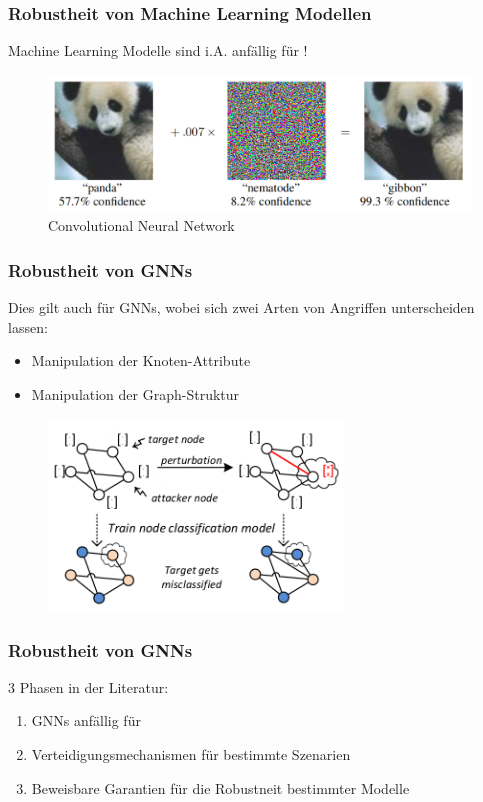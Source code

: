 \documentclass{beamer}
\begin{document}
\begin{frame}
  \frametitle{Robustheit von Machine Learning Modellen}

  Machine Learning Modelle sind i.A. anfällig für !

  \begin{figure}
    \centering
    \includegraphics[width=\textwidth]{img/adversarial.png}
    \caption*{Convolutional Neural Network \cite{}}
  \end{figure}
\end{frame}

\begin{frame}
  \frametitle{Robustheit von GNNs}
  Dies gilt auch für GNNs, wobei sich zwei Arten von Angriffen unterscheiden lassen:

  \begin{itemize}
    \item Manipulation der Knoten-Attribute
    \item Manipulation der Graph-Struktur
  \end{itemize}

  \begin{figure}
    \centering
    \includegraphics[width=0.7\textwidth]{img/adversarial_GNN.png}
    \caption*{ \cite{}}
  \end{figure}

\end{frame}

\begin{frame}
  \frametitle{Robustheit von GNNs}
  3 Phasen in der Literatur:
  \begin{enumerate}
    \item GNNs anfällig für 
    \item Verteidigungsmechanismen für bestimmte Szenarien
    \item Beweisbare Garantien für die Robustneit bestimmter Modelle
  \end{enumerate}
\end{frame}
\end{document}
